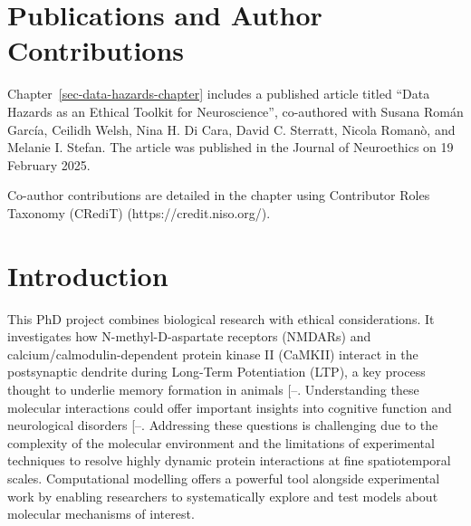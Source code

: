 \documentclass[
  11pt,
  letterpaper,
]{scrreprt}
\begin{document}

\chapter*{Publications and Author
Contributions}\label{publications-and-author-contributions}


Chapter~\ref{sec-data-hazards-chapter} includes a published article
titled ``Data Hazards as an Ethical Toolkit for Neuroscience'',
co-authored with Susana Román García, Ceilidh Welsh, Nina H. Di Cara,
David C. Sterratt, Nicola Romanò, and Melanie I. Stefan. The article was
published in the Journal of Neuroethics on 19 February 2025.

Co-author contributions are detailed in the chapter using Contributor
Roles Taxonomy (CRediT) (https://credit.niso.org/).


\chapter*{Introduction}\label{introduction}


This PhD project combines biological research with ethical
considerations. It investigates how N-methyl-D-aspartate receptors
(NMDARs) and calcium/calmodulin-dependent protein kinase II (CaMKII)
interact in the postsynaptic dendrite during Long-Term Potentiation
(LTP), a key process thought to underlie memory formation in animals
{[}--\citeproc{ref-park2024Fear}{4}{]}.
Understanding these molecular interactions could offer important
insights into cognitive function and neurological disorders
{[}--\citeproc{ref-yang2023NMDA}{8}{]}.
Addressing these questions is challenging due to the complexity of the
molecular environment and the limitations of experimental techniques to
resolve highly dynamic protein interactions at fine spatiotemporal
scales. Computational modelling offers a powerful tool alongside
experimental work by enabling researchers to systematically explore and
test models about molecular mechanisms of interest.
\end{document}
